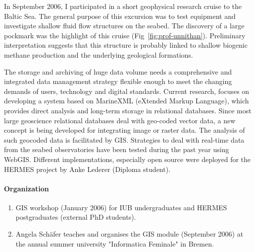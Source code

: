 In September 2006, I participated in a short geophysical research
cruise to the Baltic Sea.
 The general purpose of this excursion was to test equipment and investigate shallow fluid flow structures
 on the seabed. The discovery of a large pockmark was the highlight of this cruise (Fig~\ref{fig:prof-unnithan}). Preliminary interpretation suggests that this structure is probably linked to shallow biogenic methane production and the underlying geological formations.

The storage and archiving of huge data volume needs a comprehensive and integrated data management strategy flexible enough to meet the changing demands of users, technology and digital standards. Current research, focuses on developing a system based on MarineXML (eXtended Markup Language), which provides direct analysis and long-term storage in relational databases. Since most large geoscience relational databases deal with
geo-coded vector data, a new concept is being developed for integrating image or raster data. The analysis of such geocoded data is facilitated by GIS. Strategies to deal with real-time data from the seabed observatories have been tested during the past year using WebGIS. Different implementations, especially open source were deployed for the HERMES project by Anke Lederer (Diploma student).




\paragraph{Organization}

\begin{enumerate}
\item GIS workshop (January 2006) for IUB undergraduates and HERMES postgraduates (external PhD students).
\item Angela Sch\"{a}fer teaches and organises the GIS module (September 2006) at the annual summer university "Informatica Feminale" in Bremen.
\end{enumerate}

